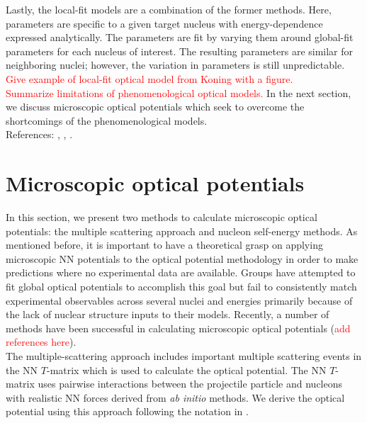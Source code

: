 \documentclass[preprintnumbers,floatfix,aps,prc,preprint,nofootinbib]{revtex4-1}
\begin{document}
Lastly, the local-fit models are a combination of the former methods. Here, parameters are specific to a given target nucleus with energy-dependence expressed analytically. The parameters are fit by varying them around global-fit parameters for each nucleus of interest. The resulting parameters are similar for neighboring nuclei; however, the variation in parameters is still unpredictable. \textcolor{red}{Give example of local-fit optical model from Koning with a figure.}
\\

\textcolor{red}{Summarize limitations of phenomenological optical models.} In the next section, we discuss microscopic optical potentials which seek to overcome the shortcomings of the phenomenological models.
\\

References: \cite{Dickhoff:2018wdd}, \cite{Perey:1976zz}, \cite{Koning:2003zz}.


\section{Microscopic optical potentials}
\label{sec:microscopic}


In this section, we present two methods to calculate microscopic optical potentials: the multiple scattering approach and nucleon self-energy methods. As mentioned before, it is important to have a theoretical grasp on applying microscopic NN potentials to the optical potential methodology in order to make predictions where no experimental data are available. Groups have attempted to fit global optical potentials to accomplish this goal but fail to consistently match experimental observables across several nuclei and energies primarily because of the lack of nuclear structure inputs to their models. Recently, a number of methods have been successful in calculating microscopic optical potentials (\textcolor{red}{add references here}).
\\


The multiple-scattering approach includes important multiple scattering events in the NN $T$-matrix which is used to calculate the optical potential. The NN $T$-matrix uses pairwise interactions between the projectile particle and nucleons with realistic NN forces derived from \textit{ab initio} methods. We derive the optical potential using this approach following the notation in \cite{Dickhoff:2018wdd}.
\\
\end{document}
